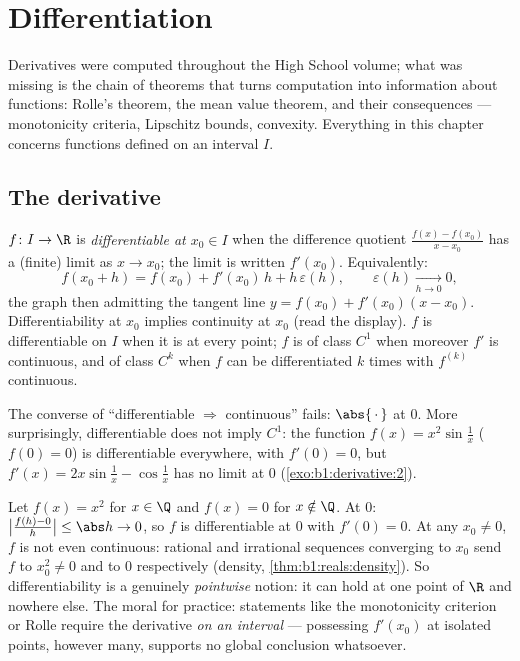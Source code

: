 \chapter{Differentiation}\label{ch:b1:derivative}

Derivatives were computed throughout the High School volume; what was
missing is the chain of theorems that turns computation into
information about functions: Rolle's theorem, the mean value theorem,
and their consequences --- monotonicity criteria, Lipschitz bounds,
convexity. Everything in this chapter concerns functions defined on
an interval $I$.

\section{The derivative}

\begin{definition}\label{def:b1:derivative:def}
$f \colon I \to \R$ is \emph{differentiable at $x_0 \in
I$} when the difference quotient
$\frac{f(x) - f(x_0)}{x - x_0}$ has a (finite) limit as $x \to x_0$;
the limit is written $f'(x_0)$. Equivalently:
\[
f(x_0 + h) = f(x_0) + f'(x_0)\,h + h\,\varepsilon(h),
\qquad \varepsilon(h) \xrightarrow[h \to 0]{} 0 ,
\]
the graph then admitting the tangent line $y = f(x_0) + f'(x_0)(x -
x_0)$. Differentiability at $x_0$ implies continuity at $x_0$ (read
the display). $f$ is differentiable on $I$ when it is at every point;
$f$ is of class $C^1$ when moreover $f'$ is continuous, and of
class $C^k$ when $f$ can be
differentiated $k$ times with $f^{(k)}$ continuous.
\end{definition}

\begin{example}\label{ex:b1:derivative:notc1}
The converse of ``differentiable $\Rightarrow$ continuous'' fails:
$\abs{\,\cdot\,}$ at $0$. More surprisingly, differentiable does not
imply $C^1$: the function $f(x) = x^2 \sin\frac 1x$ ($f(0) = 0$) is
differentiable everywhere, with $f'(0) = 0$, but $f'(x) = 2x
\sin\frac1x - \cos\frac 1x$ has no limit at $0$
(\cref{exo:b1:derivative:2}).
\end{example}

\begin{example}\label{ex:b1:derivative:onepoint}
Let $f(x) = x^2$ for $x \in \Q$ and $f(x) = 0$ for $x \notin
\Q$. At $0$: $\bigl|\frac{f(h) - 0}{h}\bigr| \leq \abs h \to 0$,
so $f$ is differentiable at $0$ with $f'(0) = 0$. At any $x_0
\neq 0$, $f$ is not even continuous: rational and irrational
sequences converging to $x_0$ send $f$ to $x_0^2 \neq 0$ and to
$0$ respectively (density, \cref{thm:b1:reals:density}). So
differentiability is a genuinely \emph{pointwise} notion: it can
hold at one point of $\R$ and nowhere else. The moral for
practice: statements like the monotonicity criterion or Rolle
require the derivative \emph{on an interval} --- possessing
$f'(x_0)$ at isolated points, however many, supports no global
conclusion whatsoever.
\end{example}

